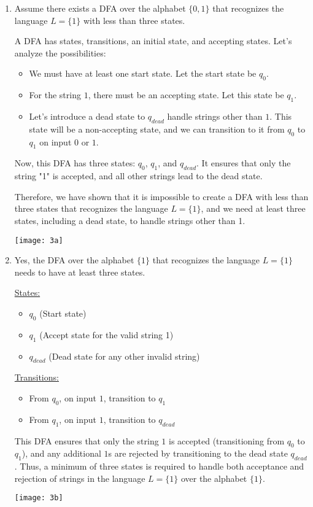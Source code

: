 \documentclass[letterpaper,12pt]{article}
\newcounter{problemid}
\def\newproblem{\clearpage\newpage{\bf Problem~\arabic{problemid}\stepcounter{problemid}}\hfill\par}
\begin{document}
\newproblem
\begin{enumerate}
    \item 
    Assume there exists a DFA over the alphabet $\{ 0, 1 \}$ that recognizes the language $L = \{ 1 \}$ with less than three states.

    A DFA has states, transitions, an initial state, and accepting states. Let's analyze the possibilities:

    \begin{itemize}
        \item We must have at least one start state. Let the start state be $q_0$.
        \item For the string $1$, there must be an accepting state. Let this state be $q_1$.
        \item Let's introduce a dead state to $q_{dead}$ handle strings other than $1$. This state will be a non-accepting state, and we can transition to it from $q_0$ to $q_1$ on input $0$ or $1$.
    \end{itemize}

    Now, this DFA has three states: $q_0$, $q_1$, and $q_{dead}$. It ensures that only the string "1" is accepted, and all other strings lead to the dead state.

    Therefore, we have shown that it is impossible to create a DFA with less than three states that recognizes the language $L = \{ 1 \}$, and we need at least three states, including a dead state, to handle strings other than 1.
    
    \texttt{[image: 3a]}

    \item 
    Yes, the DFA over the alphabet $\{ 1 \}$ that recognizes the language $L = \{ 1 \}$ needs to have at least three states.

    \underline{States:}
    \begin{itemize}
        \item $q_0$ (Start state)
        \item $q_1$ (Accept state for the valid string 1)
        \item $q_{dead}$ (Dead state for any other invalid string)
    \end{itemize}

    \underline{Transitions:}
    \begin{itemize}
        \item From $q_0$, on input $1$, transition to $q_1$
        \item From $q_1$, on input $1$, transition to $q_{dead}$
    \end{itemize}

    This DFA ensures that only the string $1$ is accepted (transitioning from $q_0$ to $q_1$), and any additional $1$s are rejected by transitioning to the dead state $q_{dead}$. Thus, a minimum of three states is required to handle both acceptance and rejection of strings in the language $L = \{ 1 \}$ over the alphabet $\{ 1 \}$.

    \texttt{[image: 3b]}
\end{enumerate}
\end{document}
